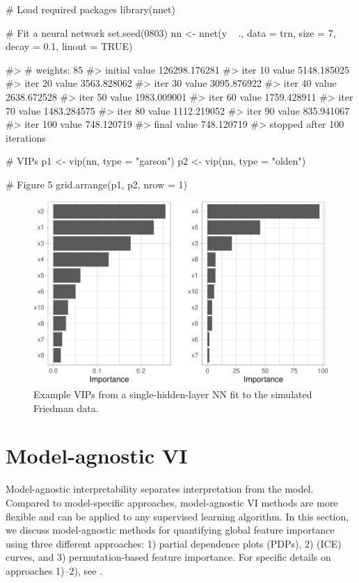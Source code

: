 \begin{Schunk}
\begin{Sinput}
# Load required packages
library(nnet)

# Fit a neural network
set.seed(0803)
nn <- nnet(y ~ ., data = trn, size = 7, decay = 0.1, linout = TRUE)
\end{Sinput}
\begin{Soutput}
#> # weights:  85
#> initial  value 126298.176281 
#> iter  10 value 5148.185025
#> iter  20 value 3563.828062
#> iter  30 value 3095.876922
#> iter  40 value 2638.672528
#> iter  50 value 1983.009001
#> iter  60 value 1759.428911
#> iter  70 value 1483.284575
#> iter  80 value 1112.219052
#> iter  90 value 835.941067
#> iter 100 value 748.120719
#> final  value 748.120719 
#> stopped after 100 iterations
\end{Soutput}
\begin{Sinput}
# VIPs
p1 <- vip(nn, type = "garson")
p2 <- vip(nn, type = "olden")

# Figure 5
grid.arrange(p1, p2, nrow = 1)
\end{Sinput}
\begin{figure}[!htb]

{\centering \includegraphics[width=0.7\linewidth]{greenwell-boehmke_files/figure-latex/vip-nnet-1} 

}

\caption[Example VIPs from a single-hidden-layer NN fit to the simulated Friedman data]{Example VIPs from a single-hidden-layer NN fit to the simulated Friedman data.}\label{fig:vip-nnet}
\end{figure}
\end{Schunk}

\section{Model-agnostic VI}

Model-agnostic interpretability separates interpretation from the model.
Compared to model-specific approaches, model-agnostic VI methods are
more flexible and can be applied to any supervised learning algorithm.
In this section, we discuss model-agnostic methods for quantifying
global feature importance using three different approaches: 1) partial
dependence plots (PDPs), 2) 
(ICE) curves, and 3) permutation-based feature importance. For specific
details on approaches 1)--2), see \citet{greenwell-simple-2018}.

